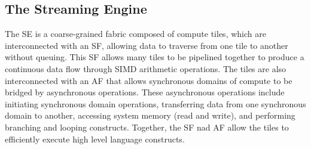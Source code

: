\subsection{The Streaming Engine}

The SE is a coarse-grained fabric composed of compute tiles, which are interconnected with an SF, allowing data to traverse from one tile to another without queuing.
This SF allows many tiles to be pipelined together to produce a continuous data flow through SIMD arithmetic operations.
The tiles are also interconnected with an AF that allows synchronous domains of compute to be bridged by asynchronous operations.
These asynchronous operations include initiating synchronous domain operations, transferring data from one synchronous domain to another, accessing system memory (read and write), and performing branching and looping constructs.
Together, the SF nad AF allow the tiles to efficiently execute high level language constructs.


